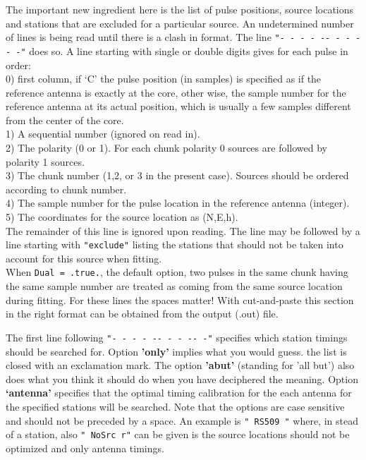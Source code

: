 The important new ingredient here is the list of pulse positions, source locations and stations that are excluded for a particular source. An undetermined number of lines is being read until there is a clash in format. The line \verb!"- - - - -- - - -- -"! does so. A line starting with single or double digits gives for each pulse in order:
\\0) first column, if `C' the pulse position (in samples) is specified as if the reference antenna is exactly at the core, other wise, the sample number for the reference antenna at its actual position, which is usually a few samples different from the center of the core.
\\1) A sequential number (ignored on read in).
\\2) The polarity (0 or 1). For each chunk  polarity 0 sources are followed by polarity 1 sources.
\\3) The chunk number (1,2, or 3 in the present case). Sources should be ordered according to chunk number.
\\4) The sample number for the pulse location in the reference antenna (integer).
\\5) The coordinates for the source location as (N,E,h).
\\The remainder of this line is ignored upon reading. The line may be followed by a line starting with \verb!"exclude"! listing the stations that should not be taken into account for this source when fitting.
\\When  \verb!Dual = .true.!, the default option, two pulses in the same chunk having the same sample number are treated as coming from the same source location during fitting. For these lines the spaces matter! With cut-and-paste this section in the right format can be obtained from the output (.out) file.

The first line following \verb!"- - - - -- - - -- -"! specifies which station timings should be searched for. Option {\bf 'only'} implies what you would guess. the list is closed with an exclamation mark. The option {\bf 'abut'} (standing for 'all but') also does what you think it should do when you have deciphered the meaning. Option {\bf `antenna'} specifies that the optimal timing calibration for the each antenna for the specified stations will be searched. Note that the options are case sensitive and should not be preceded by a space. An example is \verb!" RS509 "! where, in stead of a station, also  \verb!" NoSrc r"! can be given is the source locations should not be optimized and only antenna timings.

